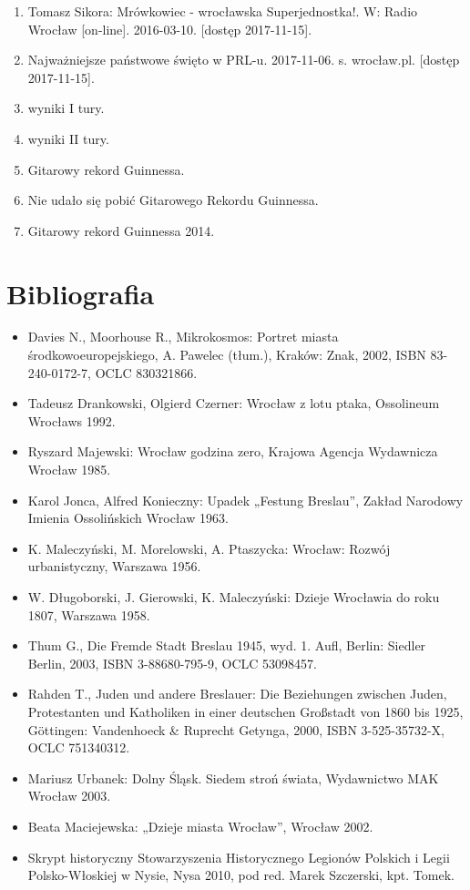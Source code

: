 \documentclass{article}
\begin{document}
\begin{enumerate}
    \item  Tomasz Sikora: Mrówkowiec - wrocławska Superjednostka!. W: Radio Wrocław [on-line]. 2016-03-10. [dostęp 2017-11-15].
    \item  Najważniejsze państwowe święto w PRL-u. 2017-11-06. s. wrocław.pl. [dostęp 2017-11-15].
    \item  wyniki I tury.
    \item  wyniki II tury.
    \item  Gitarowy rekord Guinnessa.
    \item  Nie udało się pobić Gitarowego Rekordu Guinnessa.
    \item  Gitarowy rekord Guinnessa 2014.
\end{enumerate}
\section{Bibliografia}
\hrulefill

\begin{itemize}
    \item Davies N., Moorhouse R., Mikrokosmos: Portret miasta środkowoeuropejskiego, A. Pawelec (tłum.), Kraków: Znak, 2002, ISBN 83-240-0172-7, OCLC 830321866.
    \item Tadeusz Drankowski, Olgierd Czerner: Wrocław z lotu ptaka, Ossolineum Wrocławs 1992.
    \item Ryszard Majewski: Wrocław godzina zero, Krajowa Agencja Wydawnicza Wrocław 1985.
    \item Karol Jonca, Alfred Konieczny: Upadek „Festung Breslau”, Zakład Narodowy Imienia Ossolińskich Wrocław 1963.
    \item K. Maleczyński, M. Morelowski, A. Ptaszycka: Wrocław: Rozwój urbanistyczny, Warszawa 1956.
    \item W. Długoborski, J. Gierowski, K. Maleczyński: Dzieje Wrocławia do roku 1807, Warszawa 1958.
    \item Thum G., Die Fremde Stadt Breslau 1945, wyd. 1. Aufl, Berlin: Siedler Berlin, 2003, ISBN 3-88680-795-9, OCLC 53098457.
    \item Rahden T., Juden und andere Breslauer: Die Beziehungen zwischen Juden, Protestanten und Katholiken in einer deutschen Großstadt von 1860 bis 1925, Göttingen: Vandenhoeck & Ruprecht Getynga, 2000, ISBN 3-525-35732-X, OCLC 751340312.
    \item Mariusz Urbanek: Dolny Śląsk. Siedem stroń świata, Wydawnictwo MAK Wrocław 2003.
    \item Beata Maciejewska: „Dzieje miasta Wrocław”, Wrocław 2002.
    \item Skrypt historyczny Stowarzyszenia Historycznego Legionów Polskich i Legii Polsko-Włoskiej w Nysie, Nysa 2010, pod red. Marek Szczerski, kpt. Tomek.
\end{itemize}
\end{document}
